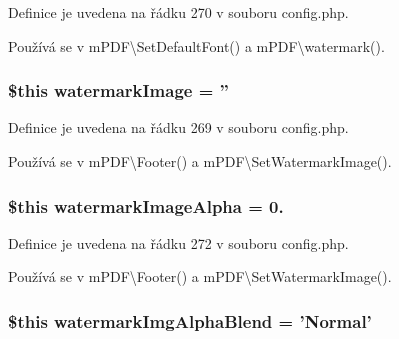 Definice je uvedena na řádku 270 v souboru config.\-php.



Používá se v m\-P\-D\-F\textbackslash{}\-Set\-Default\-Font() a m\-P\-D\-F\textbackslash{}watermark().

\hypertarget{config_8php_a579029f1a6c08d56833da40ef27488a8}{
\subsubsection[{watermark\-Image}]{\setlength{\rightskip}{0pt plus 5cm}\$this watermark\-Image = ''}}\label{config_8php_a579029f1a6c08d56833da40ef27488a8}


Definice je uvedena na řádku 269 v souboru config.\-php.



Používá se v m\-P\-D\-F\textbackslash{}\-Footer() a m\-P\-D\-F\textbackslash{}\-Set\-Watermark\-Image().

\hypertarget{config_8php_a8a0d522d96d96ab665d92a62b2cf764b}{
\subsubsection[{watermark\-Image\-Alpha}]{\setlength{\rightskip}{0pt plus 5cm}\$this watermark\-Image\-Alpha = 0.}}\label{config_8php_a8a0d522d96d96ab665d92a62b2cf764b}


Definice je uvedena na řádku 272 v souboru config.\-php.



Používá se v m\-P\-D\-F\textbackslash{}\-Footer() a m\-P\-D\-F\textbackslash{}\-Set\-Watermark\-Image().

\hypertarget{config_8php_a24cb17138e1c20b87767d70fdea55e2b}{
\subsubsection[{watermark\-Img\-Alpha\-Blend}]{\setlength{\rightskip}{0pt plus 5cm}\$this watermark\-Img\-Alpha\-Blend = 'Normal'}}\label{config_8php_a24cb17138e1c20b87767d70fdea55e2b}



